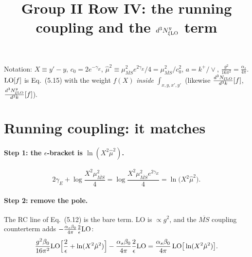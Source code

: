 \documentclass[10pt]{article}
\title{Group II Row IV: the running coupling and the $d^3N^y_{\xi\rm LO}$ term}
\date{}
\numberwithin{equation}{section}
\newcommand{\MSb}{\overline{MS}}
\newcommand{\LO}{{\rm LO}}
\begin{document}
\maketitle
\noindent Notation: $X\equiv y'-y$, $c_0=2e^{-\gamma_E}$, $\hat\mu^2\equiv\mu^2_{\MSb}e^{2\gamma_E}/4=\mu^2_{\MSb}/c_0^2$, $a=k^+/\vee$, $\frac{g^2}{16\pi^2}=\frac{\alpha_s}{4\pi}$. $\LO[f]$ is Eq.~(5.15) with the weight $f(X)$ \emph{inside} $\int_{x,y,x',y'}$ (likewise $\frac{d^3N_{\xi\rm LO}}{d^3k}[f]$, $\frac{d^3N^y_{\xi\rm LO}}{d^3k}[f]$).

\section{Running coupling: it matches}
\paragraph{Step 1: the $\epsilon$-bracket is $\ln(X^2\hat\mu^2)$.}
\begin{equation}
2\gamma_E+\log\frac{X^2\mu^2_{\MSb}}{4}=\log\frac{X^2\mu^2_{\MSb}e^{2\gamma_E}}{4}=\ln\big(X^2\hat\mu^2\big).
\end{equation}
\paragraph{Step 2: remove the pole.} The RC line of Eq.~(5.12) is the bare term. LO is $\propto g^2$, and the $\MSb$ coupling counterterm adds $-\frac{\alpha_s\beta_0}{4\pi}\frac2\epsilon\LO$:
\begin{equation}
\frac{g^2\beta_0}{16\pi^2}\LO\Big[\frac2\epsilon+\ln(X^2\hat\mu^2)\Big]-\frac{\alpha_s\beta_0}{4\pi}\frac{2}{\epsilon}\LO=\frac{\alpha_s\beta_0}{4\pi}\,\LO\big[\ln(X^2\hat\mu^2)\big].\label{eq:rc}
\end{equation}
\end{document}
